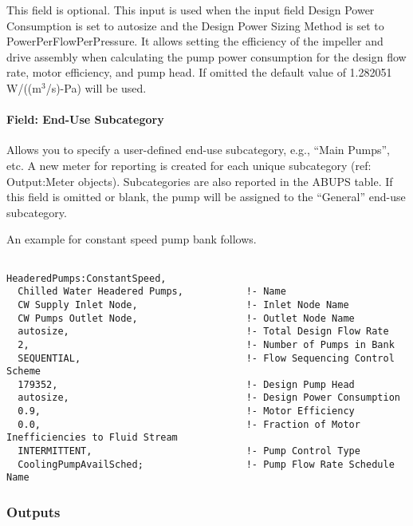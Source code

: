 This field is optional. This input is used when the input field Design Power Consumption is set to autosize and the Design Power Sizing Method is set to PowerPerFlowPerPressure. It allows setting the efficiency of the impeller and drive assembly when calculating the pump power consumption for the design flow rate, motor efficiency, and pump head. If omitted the default value of 1.282051 W/((m\(^{3}\)/s)-Pa) will be used.

\paragraph{Field: End-Use Subcategory}\label{field-end-use-subcategory-4-000}

Allows you to specify a user-defined end-use subcategory, e.g., ``Main Pumps'', etc. A new meter for reporting is created for each unique subcategory (ref: Output:Meter objects). Subcategories are also reported in the ABUPS table. If this field is omitted or blank, the pump will be assigned to the ``General'' end-use subcategory.

An example for constant speed pump bank follows.

\begin{lstlisting}

HeaderedPumps:ConstantSpeed,
  Chilled Water Headered Pumps,           !- Name
  CW Supply Inlet Node,                   !- Inlet Node Name
  CW Pumps Outlet Node,                   !- Outlet Node Name
  autosize,                               !- Total Design Flow Rate
  2,                                      !- Number of Pumps in Bank
  SEQUENTIAL,                             !- Flow Sequencing Control Scheme
  179352,                                 !- Design Pump Head
  autosize,                               !- Design Power Consumption
  0.9,                                    !- Motor Efficiency
  0.0,                                    !- Fraction of Motor Inefficiencies to Fluid Stream
  INTERMITTENT,                           !- Pump Control Type
  CoolingPumpAvailSched;                  !- Pump Flow Rate Schedule Name
\end{lstlisting}

\subsubsection{Outputs}\label{outputs-3-014}

